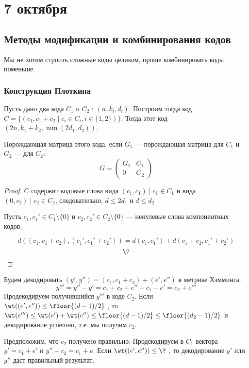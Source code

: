 \chapter{7 октября}

\section{Методы модификации и комбинирования кодов}

Мы не хотим строить сложные коды целиком, проще комбинировать коды поменьше.

\subsection{Конструкция Плоткина}

Пусть дано два кода \(C_1\) и \(C_2\) : \((n, k_i, d_i)\).
Построим тогда код \(C = \{(c_1, c_1 + c_2 \mid c_i \in C_i, i \in \{1, 2\})\}\).
Тогда этот код \((2n, k_1 + k_2, \min(2d_1, d_2))\).

Порождающая матрица этого кода, если \(G_1\) --- порождающая матрица для \(C_1\) и \(G_2\) --- для \(C_2\):
\[G = \begin{pmatrix}
    G_1 & G_1 \\
    0 & G_2
\end{pmatrix}\]
\begin{proof}
    \(C\) содержит кодовые слова вида \((c_1, c_1) \mid c_1 \in C_1\) и вида \((0, c_2) \mid c_2 \in C_2\),
    следовательно, \(d \leq 2d_1\) и \(d \leq d_2\)

    Пусть \(c_1, c_1' \in C_1 \setminus \{0\}\) и \(c_2, c_2' \in C_2 \setminus \{0\}\)
    --- ненулевые слова компонентных кодов.

    \[d((c_1, c_1 + c_2), (c_1', c_1' + c_2')) = d(c_1, c_1') + d(c_1 + c_2, c_1' + c_2')\]
    \[\?\]
\end{proof}

Будем декодировать \((y', y'') = (c_1, c_1 + c_2) + (e', e'')\) в метрике Хэмминга.
\[y''' = y'' - y' = c_1 + c_2 + e'' - c_1 - e' = c_2 + e'''\]
Продекодируем получившийся \(y'''\) в коде \(C_2\).
Если \(\wt((e', e'')) \leq \floor{(d - 1)/2}\)
, то \(\wt(e''') \leq \wt(e') + \wt(e'') \leq \floor{(d - 1)/2} \leq \floor{(d_2 - 1)/2}\) и декодирование успешно, т.е. мы получим \(c_2\).

Предположим, что \(c_2\) получено правильно.
Продекодируем в \(C_1\) вектора \(y' = c_1 + e'\) и \(y'' - c_2 = c_1 + e\).
Если \(\wt((e', e'')) \leq \?\)
, то декодирование \(y'\) или \(y''\) даст правильный результат. %

